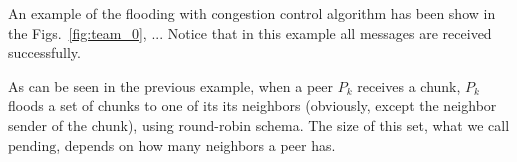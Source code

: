 \begin{notex}
  
  \begin{figure*}
  \end{figure*}

  \begin{figure*}
  \end{figure*}
  
  \begin{figure*}
  \end{figure*}

  \begin{figure*}
  \end{figure*}

  \begin{figure*}
  \end{figure*}

  \begin{figure*}
  \end{figure*}

  \begin{figure*}
  \end{figure*}

  \begin{figure*}
  \end{figure*}

  \begin{figure*}
  \end{figure*}

\end{notex}

An example of the flooding with congestion control algorithm has been
show in the Figs.~\ref{fig:team_0}, ... Notice that in this example
all messages are received successfully.

As can be seen in the previous example, when a peer $P_k$ receives a
chunk, $P_k$ floods a set of chunks to one of its its neighbors
(obviously, except the neighbor sender of the chunk), using
round-robin schema. The size of this set, what we call
$\text{pending}$, depends on how many neighbors a peer has.





